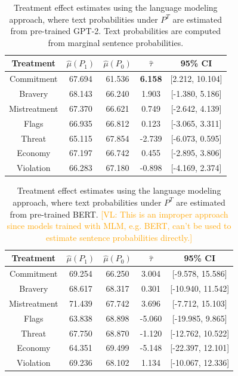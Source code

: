 \documentclass{article}
\newcommand{\vl}[1]{\textcolor{orange}{[VL: #1]}}
\begin{document}
\begin{table}[!ht]
    \centering
    \begin{tabular}{c|cccc}
        \toprule
        Treatment & $\hat{\mu}(P_1)$ & $\hat{\mu}(P_0)$ & $\hat{\tau}$ & 95\% CI \\
        \midrule
        Commitment & 67.694 & 61.536 & \textbf{\textcolor{green!50!black}{6.158}} & [2.212, 10.104] \\
        Bravery & 68.143 & 66.240 & \textcolor{green!50!black}{1.903} & [-1.380, 5.186] \\
        Mistreatment & 67.370 & 66.621 & \textcolor{green!50!black}{0.749} & [-2.642, 4.139] \\
        Flags & 66.935 & 66.812 & \textcolor{green!50!black}{0.123} & [-3.065, 3.311] \\
        Threat & 65.115 & 67.854 & \textcolor{red!80!black}{-2.739} & [-6.073, 0.595] \\
        Economy & 67.197 & 66.742 & \textcolor{green!50!black}{0.455} & [-2.895, 3.806] \\
        Violation & 66.283 & 67.180 & \textcolor{red!80!black}{-0.898} & [-4.169, 2.374] \\
        \bottomrule
    \end{tabular}
    \caption{Treatment effect estimates using the language modeling approach, where text probabilities under $P^T$ are estimated from pre-trained GPT-2. Text probabilities are computed from marginal sentence probabilities.}
    \label{tab:results_lm3_old}
\end{table}

\begin{table}[!ht]
    \centering
    \begin{tabular}{c|cccc}
        \toprule
        Treatment & $\hat{\mu}(P_1)$ & $\hat{\mu}(P_0)$ & $\hat{\tau}$ & 95\% CI \\
        \midrule
        Commitment & 69.254 & 66.250 & \textcolor{green!50!black}{3.004} & [-9.578, 15.586] \\
        Bravery & 68.617 & 68.317 & \textcolor{green!50!black}{0.301} & [-10.940, 11.542] \\
        Mistreatment & 71.439 & 67.742 & \textcolor{green!50!black}{3.696} & [-7.712, 15.103] \\
        Flags & 63.838 & 68.898 & \textcolor{red!80!black}{-5.060} & [-19.985, 9.865] \\
        Threat & 67.750 & 68.870 & \textcolor{red!80!black}{-1.120} & [-12.762, 10.522] \\
        Economy & 64.351 & 69.499 & \textcolor{red!80!black}{-5.148} & [-22.397, 12.101] \\
        Violation & 69.236 & 68.102 & \textcolor{green!50!black}{1.134} & [-10.067, 12.336] \\
        \bottomrule
    \end{tabular}
    \caption{Treatment effect estimates using the language modeling approach, where text probabilities under $P^T$ are estimated from pre-trained BERT. \vl{This is an improper approach since models trained with MLM, e.g. BERT, can't be used to estimate sentence probabilities directly.}}
    \label{tab:results_lm1_bert}
\end{table}

\newpage


\end{document}
